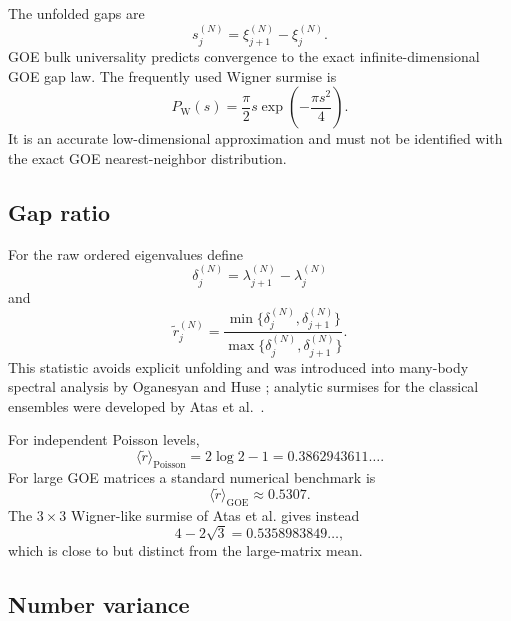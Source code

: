 \documentclass[11pt]{amsart}
\numberwithin{equation}{section}
\theoremstyle{plain}
\theoremstyle{definition}
\theoremstyle{remark}
\newcommand{\GOE}{\mathrm{GOE}}
\newcommand{\Poisson}{\mathrm{Poisson}}
\begin{document}
The unfolded gaps are
\begin{equation}
s_j^{(N)}=\xi_{j+1}^{(N)}-\xi_j^{(N)}.
\label{eq:unfolded_gap}
\end{equation}
GOE bulk universality predicts convergence to the exact infinite-dimensional GOE gap law.  The frequently used Wigner surmise is
\begin{equation}
P_{\mathrm W}(s)
=
\frac{\pi}{2}s\exp\!\left(-\frac{\pi s^2}{4}\right).
\label{eq:wigner_surmise}
\end{equation}
It is an accurate low-dimensional approximation and must not be identified with the exact GOE nearest-neighbor distribution.

\subsection{Gap ratio}
\label{subsec:gap_ratio}

For the raw ordered eigenvalues define
\begin{equation}
\delta_j^{(N)}=\lambda_{j+1}^{(N)}-\lambda_j^{(N)}
\label{eq:raw_gap}
\end{equation}
and
\begin{equation}
\widetilde r_j^{(N)}
=
\frac{\min\{\delta_j^{(N)},\delta_{j+1}^{(N)}\}}
{\max\{\delta_j^{(N)},\delta_{j+1}^{(N)}\}}.
\label{eq:ratio_statistic}
\end{equation}
This statistic avoids explicit unfolding and was introduced into many-body spectral analysis by Oganesyan and Huse \cite{OganesyanHuse2007}; analytic surmises for the classical ensembles were developed by Atas et al.\ \cite{Atas2013}.

For independent Poisson levels,
\begin{equation}
\langle\widetilde r\rangle_{\Poisson}
=2\log 2-1
=0.3862943611\ldots.
\label{eq:poisson_gap_ratio}
\end{equation}
For large GOE matrices a standard numerical benchmark is
\begin{equation}
\langle\widetilde r\rangle_{\GOE}\approx0.5307.
\label{eq:goe_gap_ratio}
\end{equation}
The $3\times3$ Wigner-like surmise of Atas et al. gives instead
\begin{equation}
4-2\sqrt3=0.5358983849\ldots,
\label{eq:atas_gap_ratio}
\end{equation}
which is close to but distinct from the large-matrix mean.

\subsection{Number variance}
\label{subsec:number_variance}
\end{document}
